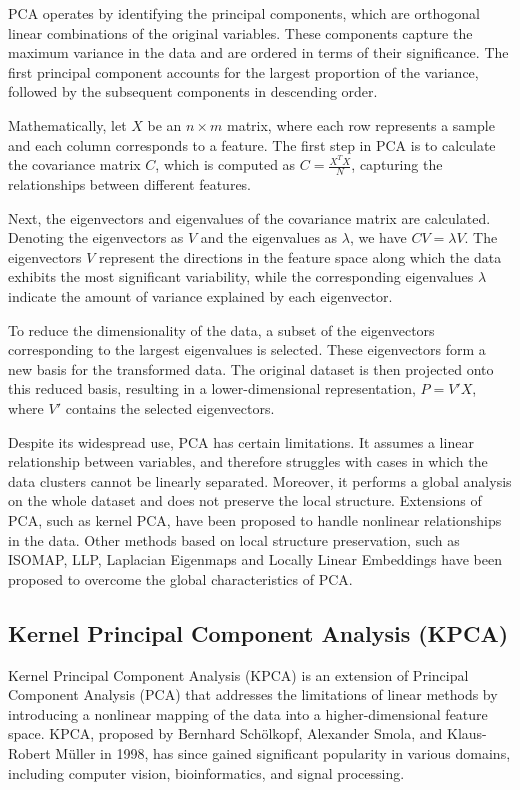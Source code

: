 PCA operates by identifying the principal components, which are orthogonal linear combinations of the original variables. These components capture the maximum variance in the data and are ordered in terms of their significance. The first principal component accounts for the largest proportion of the variance, followed by the subsequent components in descending order.

Mathematically, let $X$ be an $n \times m$ matrix, where each row represents a sample and each column corresponds to a feature. The first step in PCA is to calculate the covariance matrix $C$, which is computed as $C = \frac{X^T X}{N}$, capturing the relationships between different features.

Next, the eigenvectors and eigenvalues of the covariance matrix are calculated. Denoting the eigenvectors as $V$ and the eigenvalues as $\lambda$, we have $C V = \lambda V$. The eigenvectors $V$ represent the directions in the feature space along which the data exhibits the most significant variability, while the corresponding eigenvalues $\lambda$ indicate the amount of variance explained by each eigenvector.

To reduce the dimensionality of the data, a subset of the eigenvectors corresponding to the largest eigenvalues is selected. These eigenvectors form a new basis for the transformed data. The original dataset is then projected onto this reduced basis, resulting in a lower-dimensional representation, $P = V' X$, where $V'$ contains the selected eigenvectors.

Despite its widespread use, PCA has certain limitations. It assumes a linear relationship between variables, and therefore struggles with cases in which the data clusters cannot be linearly separated. Moreover, it performs a global analysis on the whole dataset and does not preserve the local structure.
Extensions of PCA, such as kernel PCA, have been proposed to handle nonlinear relationships in the data. Other methods based on local structure preservation, such as ISOMAP, LLP, Laplacian Eigenmaps and Locally Linear Embeddings have been proposed to overcome the global characteristics of PCA.


\subsection{Kernel Principal Component Analysis (KPCA)}
Kernel Principal Component Analysis (KPCA) \cite{kpca} is an extension of Principal Component Analysis (PCA) that addresses the limitations of linear methods by introducing a nonlinear mapping of the data into a higher-dimensional feature space. KPCA, proposed by Bernhard Schölkopf, Alexander Smola, and Klaus-Robert Müller in 1998, has since gained significant popularity in various domains, including computer vision, bioinformatics, and signal processing.

